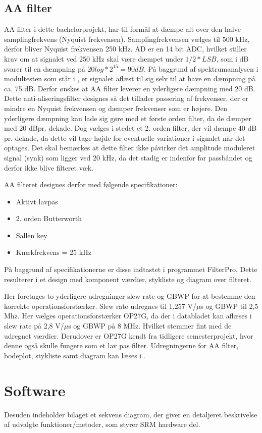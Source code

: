 \subsection{AA filter}

AA filter i dette bachelorprojekt, har til formål at dæmpe alt over den halve samplingfrekvens (Nyquist frekvensen). Samplingfrekvensen vælges til 500 kHz, derfor bliver Nyquist frekvensen 250 kHz. AD er en 14 bit ADC, hvilket stiller krav om at signalet ved 250 kHz skal være dæmpet under $1/2*LSB$, som i dB svarer til en dæmpning på $20log*2^{15}=90dB$. På baggrund af spektrumanalysen i modultesten som står i , er signalet aflæst til sig selv til at have en dæmpning på ca. 75 dB. Derfor ønskes at AA filter leverer en yderligere dæmpning med 20 dB. Dette anti-aliseringsfilter designes så det tillader passering af frekvenser, der er mindre en Nyquist frekvensen og dæmper frekvenser som er højere. Den yderligere dæmpning kan lade sig gøre med et første orden filter, da de dæmper med 20 dBpr. dekade. Dog vælges i stedet et 2. orden filter, der vil dæmpe 40 dB pr. dekade, da dette vil tage højde for eventuelle variationer i signalet når det optages. Det skal bemærkes at dette filter ikke påvirker det amplitude moduleret signal (synk) som ligger ved 20 kHz, da det stadig er indenfor for passbåndet og derfor ikke blive filteret væk.

AA filteret designes derfor med følgende specifikationer:
\begin{itemize}
\item Aktivt lavpas
\item 2. orden Butterworth
\item Sallen key
\item Knækfrekvens = 25 kHz
\end{itemize}

På baggrund af specifikationerne er disse indtastet i programmet FilterPro. Dette resulterer i et design med komponent værdier, stykliste og diagram over filteret. 

Her foretages to yderligere udregninger slew rate og GBWP for at bestemme den korrekte operationsforstærker. Slew rate udregnes til 1,257 V/$\mu$s og GBWP til 2,5 Mhz. Her vælges operationsforstærker OP27G, da der i databladet kan aflæses i slew rate på 2,8 V/$\mu$s og GBWP på 8 MHz. Hvilket stemmer fint med de udregnet værdier. Derudover er OP27G kendt fra tidligere semesterprojekt, hvor denne også skulle fungere som et lav pas filter. Udregningerne for AA filter, bodeplot, stykliste samt diagram kan læses i .


\section{Software}

Desuden indeholder bilaget et sekvens
diagram, der giver en detaljeret beskrivelse af udvalgte funktioner/metoder, som styrer
SRM hardware del.